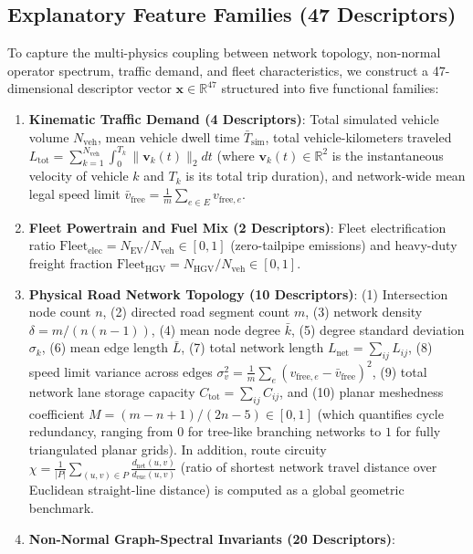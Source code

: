 \documentclass[journal]{IEEEtran}
\begin{document}
\subsection{Explanatory Feature Families (47 Descriptors)}
To capture the multi-physics coupling between network topology, non-normal operator spectrum, traffic demand, and fleet characteristics, we construct a 47-dimensional descriptor vector $\mathbf{x} \in \mathbb{R}^{47}$ structured into five functional families:

\begin{enumerate}
    \item \textbf{Kinematic Traffic Demand (4 Descriptors)}: Total simulated vehicle volume $N_{\text{veh}}$, mean vehicle dwell time $\bar{T}_{\text{sim}}$, total vehicle-kilometers traveled $L_{\text{tot}} = \sum_{k=1}^{N_{\text{veh}}} \int_0^{T_k} \|\mathbf{v}_k(t)\|_2 dt$ (where $\mathbf{v}_k(t) \in \mathbb{R}^2$ is the instantaneous velocity of vehicle $k$ and $T_k$ is its total trip duration), and network-wide mean legal speed limit $\bar{v}_{\text{free}} = \frac{1}{m} \sum_{e \in E} v_{\text{free}, e}$.
    \item \textbf{Fleet Powertrain and Fuel Mix (2 Descriptors)}: Fleet electrification ratio $\text{Fleet}_{\text{elec}} = N_{\text{EV}} / N_{\text{veh}} \in [0, 1]$ (zero-tailpipe emissions) and heavy-duty freight fraction $\text{Fleet}_{\text{HGV}} = N_{\text{HGV}} / N_{\text{veh}} \in [0, 1]$.
    \item \textbf{Physical Road Network Topology (10 Descriptors)}: (1) Intersection node count $n$, (2) directed road segment count $m$, (3) network density $\delta = m / (n(n-1))$, (4) mean node degree $\bar{k}$, (5) degree standard deviation $\sigma_k$, (6) mean edge length $\bar{L}$, (7) total network length $L_{\text{net}} = \sum_{ij} L_{ij}$, (8) speed limit variance across edges $\sigma_v^2 = \frac{1}{m} \sum_{e} (v_{\text{free}, e} - \bar{v}_{\text{free}})^2$, (9) total network lane storage capacity $C_{\text{tot}} = \sum_{ij} C_{ij}$, and (10) planar meshedness coefficient $M = (m - n + 1) / (2n - 5) \in [0, 1]$ (which quantifies cycle redundancy, ranging from $0$ for tree-like branching networks to $1$ for fully triangulated planar grids). In addition, route circuity $\chi = \frac{1}{|P|} \sum_{(u,v) \in P} \frac{d_{\text{net}}(u,v)}{d_{\text{euc}}(u,v)}$ (ratio of shortest network travel distance over Euclidean straight-line distance) is computed as a global geometric benchmark.
    \item \textbf{Non-Normal Graph-Spectral Invariants (20 Descriptors)}: 

\end{enumerate}
\end{document}
